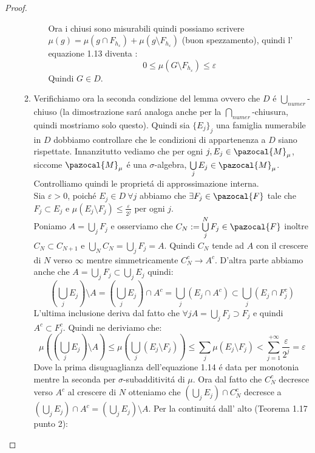 \documentclass[11pt,a4paper]{report}
\theoremstyle{plain}
\theoremstyle{definition}
\newcommand{\F}{\pazocal{F}}
\begin{document}
\begin{proof}
\begin{enumerate}
\begin{enumerate}
\begin{itemize}
\begin{equation}
				\end{equation}				
				 Ora i chiusi sono misurabili quindi possiamo scrivere $\mu(g) = \mu(g \cap F_{h_\varepsilon}) + \mu(g \setminus F_{h_\varepsilon})$ (buon spezzamento), quindi l' equazione 1.13 diventa :
				 \[
					0 \le \mu(G \setminus F_{h_\varepsilon}) \le \varepsilon				
				 \]
				 Quindi $G \in D$.
			\end{itemize}
			\item Verifichiamo ora la seconda condizione del lemma ovvero che $D$ \'e $\bigcup\limits_{numer}$-chiuso (la dimostrazione sar\'a analoga anche per la $\bigcap\limits_{numer}$-chiusura, quindi mostriamo solo questo).
			Quindi sia $\{E_j\}_j$ una famiglia numerabile in $D$ dobbiamo controllare che le condizioni di appartenenza a $D$ siano rispettate. Innanzitutto vediamo che per ogni $j, E_j \in \pazocal{M}_\mu$, siccome $\pazocal{M}_\mu$ \'e una $\sigma$-algebra, $\bigcup\limits_jE_j \in \pazocal{M}_\mu$. Controlliamo quindi le propriet\'a di approssimazione interna.\\
			Sia $\varepsilon > 0$, poich\'e $E_j \in D\ \forall j$ abbiamo che $\exists F_j \in \F$ tale che $F_j \subset E_j$ e $\mu(E_j \setminus F_j) \le \frac{\varepsilon}{2^j}$ per ogni $j$.\\
			Poniamo $A = \bigcup\limits_jF_j$ e osserviamo che $C_N := \bigcup\limits_{j}^{N}F_j \in \F$ inoltre $C_N \subset C_{N+1}$ e $\bigcup\limits_N C_N = \bigcup\limits_jF_j = A$. Quindi $C_N$ tende ad $A$ con il crescere di $N$ verso $\infty$ mentre simmetricamente $C_N^c \rightarrow A^c$. D'altra parte abbiamo anche che $A = \bigcup\limits_jF_j \subset \bigcup\limits_jE_j$ quindi: 
			\[
				(\bigcup\limits_jE_j)\setminus A = (\bigcup\limits_jE_j) \cap A^c = \bigcup\limits_j(E_j \cap A^c) \subset \bigcup\limits_j(E_j \cap F_j^c)		
			\]
			L'ultima inclusione deriva dal fatto che $\forall j A = \bigcup\limits_jF_j \supset F_j$ e quindi $A^c \subset F_j^c$. Quindi ne deriviamo che:
			\begin{equation}
				\mu((\bigcup\limits_jE_j)\setminus A) \le \mu(\bigcup\limits_j(E_j \setminus F_j)) \le \sum\limits_j \mu(E_j \setminus F_j) < \sum\limits_{j=1}^{+\infty}\frac{\varepsilon}{2^j} = \varepsilon
			\end{equation}
			Dove la prima disuguaglianza dell'equazione 1.14 \'e data per monotonia mentre la seconda per $\sigma$-subadditivit\'a di $\mu$.
			Ora dal fatto che $C_N^c$ decresce verso $A^c$ al crescere di $N$ otteniamo che $(\bigcup\limits_jE_j)\cap C_N^c$ decresce a $(\bigcup\limits_jE_j) \cap A^c = (\bigcup\limits_jE_j) \setminus A$. Per la continuit\'a dall' alto (Teorema 1.17 punto 2):

\end{enumerate}
\end{enumerate}
\end{proof}
\end{document}
